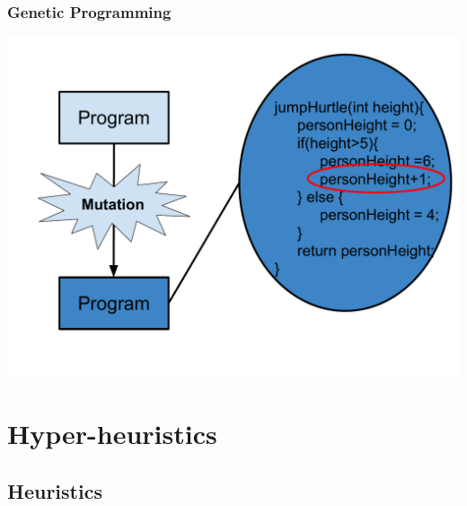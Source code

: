 \documentclass{beamer}
\begin{document}
\begin{frame}
	\frametitle{Genetic Programming}
	\includegraphics[height=.9\textheight]{Illustrations/gp_5.PDF}
\end{frame}

\section[Hyper-heuristics]{Hyper-heuristics}
\subsection{Heuristics}
\end{document}
